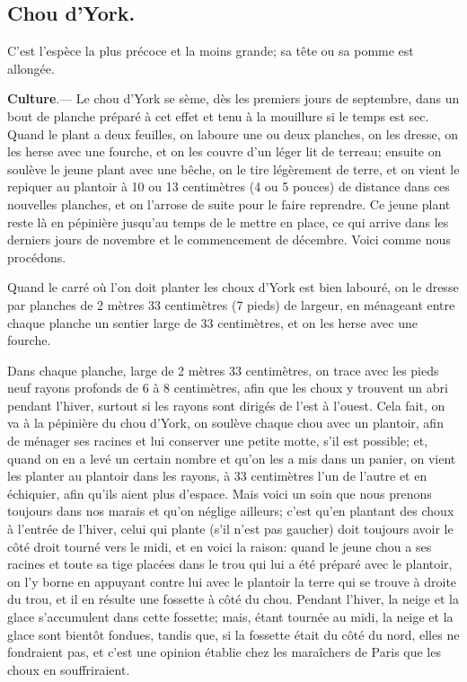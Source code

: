 \documentclass[10pt,a4paper]{book}
\begin{document}
\subsection{Chou d'York.}

C'est l'espèce la plus précoce et la moins grande; sa tête ou sa pomme est allongée.

\textbf{Culture}.--- Le chou d'York se sème, dès les premiers jours de septembre, dans un bout de planche préparé à cet effet et tenu à la mouillure si le temps est sec. Quand le plant a deux feuilles, on laboure une ou deux planches, on les dresse, on les herse avec une fourche, et on les couvre d'un léger lit de terreau; ensuite on soulève le jeune plant avec une bêche, on le tire légèrement de terre, et on vient le repiquer au plantoir à 10 ou 13 centimètres (4 ou 5 pouces) de distance dans ces nouvelles planches, et on l'arrose de suite pour le faire reprendre. Ce jeune plant reste là en pépinière jusqu'au temps de le mettre en place, ce qui arrive dans les derniers jours de novembre et le commencement de décembre. Voici comme nous procédons.

Quand le carré où l'on doit planter les choux d'York est bien labouré, on le dresse par planches de 2 mètres 33 centimètres (7 pieds) de largeur, en ménageant entre chaque planche un sentier large de 33 centimètres, et on les herse avec une fourche.

Dans chaque planche, large de 2 mètres 33 centimètres, on trace avec les pieds neuf rayons profonds de 6 à 8 centimètres, afin que les choux y trouvent un abri pendant l'hiver, surtout si les rayons sont dirigés de l'est à l'ouest. Cela fait, on va à la pépinière du chou d'York, on soulève chaque chou avec un plantoir, afin de ménager ses racines et lui conserver une petite motte, s'il est possible; et, quand on en a levé un certain nombre et qu'on les a mis dans un panier, on vient les planter au plantoir dans les rayons, à 33 centimètres l'un de l'autre et en échiquier, afin qu'ils aient plus d'espace. Mais voici un soin que nous prenons toujours dans nos marais et qu'on néglige ailleurs; c'est qu'en plantant des choux à l'entrée de l'hiver, celui qui plante (s'il n'est pas gaucher) doit toujours avoir le côté droit tourné vers le midi, et en voici la raison: quand le jeune chou a ses racines et toute sa tige placées dans le trou qui lui a été préparé avec le plantoir, on l'y borne en appuyant contre lui avec le plantoir la terre qui se trouve à droite du trou, et il en résulte une fossette à côté du chou. Pendant l'hiver, la neige et la glace s'accumulent dans cette fossette; mais, étant tournée au midi, la neige et la glace sont bientôt fondues, tandis que, si la fossette était du côté du nord, elles ne fondraient pas, et c'est une opinion établie chez les maraîchers de Paris que les choux en souffriraient.
\end{document}
